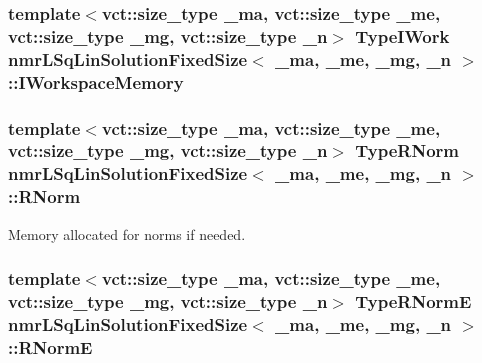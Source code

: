 \subsubsection[{I\+Workspace\+Memory}]{\setlength{\rightskip}{0pt plus 5cm}template$<$vct\+::size\+\_\+type \+\_\+ma, vct\+::size\+\_\+type \+\_\+me, vct\+::size\+\_\+type \+\_\+mg, vct\+::size\+\_\+type \+\_\+n$>$ {\bf Type\+I\+Work} {\bf nmr\+L\+Sq\+Lin\+Solution\+Fixed\+Size}$<$ \+\_\+ma, \+\_\+me, \+\_\+mg, \+\_\+n $>$\+::I\+Workspace\+Memory\hspace{0.3cm}{\ttfamily [protected]}}\label{classnmr_l_sq_lin_solution_fixed_size_a679c28e537d3e2c4d0be4592715715eb}
\hypertarget{classnmr_l_sq_lin_solution_fixed_size_ab8968759e536db86f658fe569aec7c4c}{}
\subsubsection[{R\+Norm}]{\setlength{\rightskip}{0pt plus 5cm}template$<$vct\+::size\+\_\+type \+\_\+ma, vct\+::size\+\_\+type \+\_\+me, vct\+::size\+\_\+type \+\_\+mg, vct\+::size\+\_\+type \+\_\+n$>$ {\bf Type\+R\+Norm} {\bf nmr\+L\+Sq\+Lin\+Solution\+Fixed\+Size}$<$ \+\_\+ma, \+\_\+me, \+\_\+mg, \+\_\+n $>$\+::R\+Norm\hspace{0.3cm}{\ttfamily [protected]}}\label{classnmr_l_sq_lin_solution_fixed_size_ab8968759e536db86f658fe569aec7c4c}
Memory allocated for norms if needed. \hypertarget{classnmr_l_sq_lin_solution_fixed_size_a7db2609534904651db0df467d94c13ad}{}
\subsubsection[{R\+Norm\+E}]{\setlength{\rightskip}{0pt plus 5cm}template$<$vct\+::size\+\_\+type \+\_\+ma, vct\+::size\+\_\+type \+\_\+me, vct\+::size\+\_\+type \+\_\+mg, vct\+::size\+\_\+type \+\_\+n$>$ {\bf Type\+R\+Norm\+E} {\bf nmr\+L\+Sq\+Lin\+Solution\+Fixed\+Size}$<$ \+\_\+ma, \+\_\+me, \+\_\+mg, \+\_\+n $>$\+::R\+Norm\+E\hspace{0.3cm}{\ttfamily [protected]}}\label{classnmr_l_sq_lin_solution_fixed_size_a7db2609534904651db0df467d94c13ad}
\hypertarget{classnmr_l_sq_lin_solution_fixed_size_ae7fc2b92147410b773caab779fefcb66}{}

